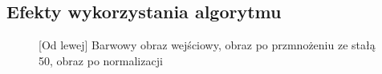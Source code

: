 \documentclass[a4paper,12pt, titlepage]{report}
\begin{document}
\subsection*{Efekty wykorzystania algorytmu}
\begin{figure}[h]
    \centering
    \caption{[Od lewej] Barwowy obraz wejściowy, obraz po przmnożeniu ze stałą 50, obraz po normalizacji}%
    \label{fig:geo_after_grey1}%
\end{figure}
\FloatBarrier
\end{document}
